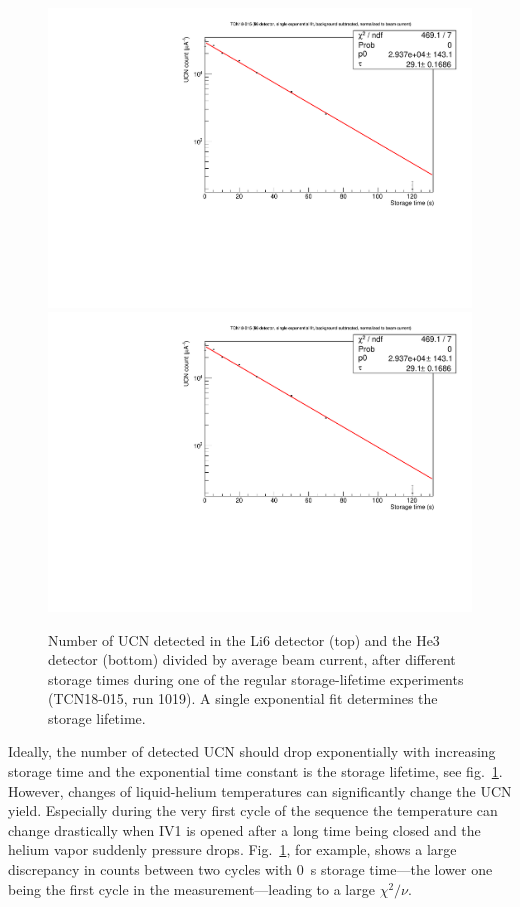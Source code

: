 \documentclass[10pt,letterpaper]{article}
\begin{document}
\begin{figure}
\centering
\includegraphics[width=\textwidth,page=1]{../storagelifetime/TCN18-015_1019.pdf}
\includegraphics[width=\textwidth,page=2]{../storagelifetime/TCN18-015_1019.pdf}
\caption{Number of UCN detected in the Li6 detector (top) and the He3 detector (bottom) divided by average beam current, after different storage times during one of the regular storage-lifetime experiments (TCN18-015, run 1019). A single exponential fit determines the storage lifetime.}
\label{fig:storagelifetime}
\end{figure}

Ideally, the number of detected UCN should drop exponentially with increasing storage time and the exponential time constant is the storage lifetime, see fig.~\ref{fig:storagelifetime}. However, changes of liquid-helium temperatures can significantly change the UCN yield. Especially during the very first cycle of the sequence the temperature can change drastically when IV1 is opened after a long time being closed and the helium vapor suddenly pressure drops. Fig.~\ref{fig:storagelifetime}, for example, shows a large discrepancy in counts between two cycles with \SI{0}{\second} storage time---the lower one being the first cycle in the measurement---leading to a large $\chi^2/\nu$.
\end{document}
